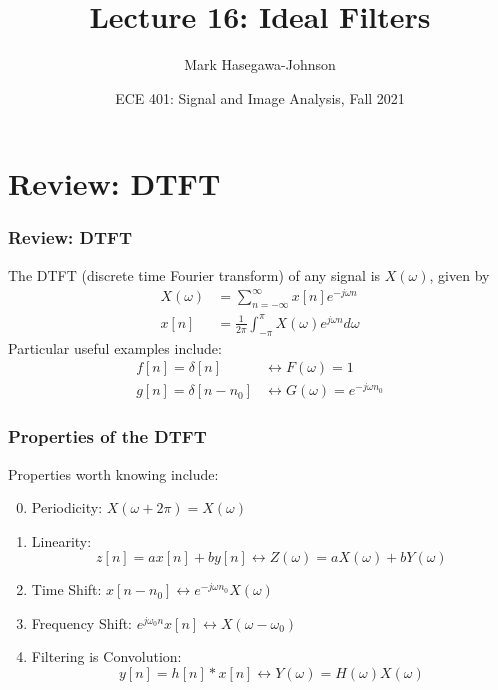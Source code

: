 \documentclass{beamer}
\title{Lecture 16: Ideal Filters}
\author{Mark Hasegawa-Johnson}
\date{ECE 401: Signal and Image Analysis, Fall 2021}
\begin{document}
\begin{frame}
  \maketitle
\end{frame}

\begin{frame}
  \tableofcontents
\end{frame}

\section[DTFT]{Review: DTFT}
\setcounter{subsection}{1}

\begin{frame}
  \frametitle{Review: DTFT}

  The DTFT (discrete time Fourier transform) of any signal is
  $X(\omega)$, given by
  \begin{align*}
    X(\omega) &= \sum_{n=-\infty}^\infty x[n]e^{-j\omega n}\\
    x[n] &= \frac{1}{2\pi}\int_{-\pi}^\pi X(\omega)e^{j\omega n}d\omega
  \end{align*}
  Particular useful examples include:
  \begin{align*}
    f[n]=\delta[n] &\leftrightarrow F(\omega)=1\\
    g[n]=\delta[n-n_0] &\leftrightarrow G(\omega)=e^{-j\omega n_0}
  \end{align*}
\end{frame}

\begin{frame}
  \frametitle{Properties of the DTFT}

  Properties worth knowing  include:
  \begin{enumerate}
    \setcounter{enumi}{-1}
  \item Periodicity: $X(\omega+2\pi)=X(\omega)$
  \item Linearity:
    \[z[n]=ax[n]+by[n]\leftrightarrow Z(\omega)=aX(\omega)+bY(\omega)
    \]
  \item Time Shift: $x[n-n_0]\leftrightarrow e^{-j\omega n_0}X(\omega)$
  \item Frequency Shift: $e^{j\omega_0 n}x[n]\leftrightarrow X(\omega-\omega_0)$
  \item Filtering is Convolution:
    \[
    y[n]=h[n]\ast x[n]\leftrightarrow Y(\omega)=H(\omega)X(\omega)
    \]
  \end{enumerate}
\end{frame}
\end{document}
